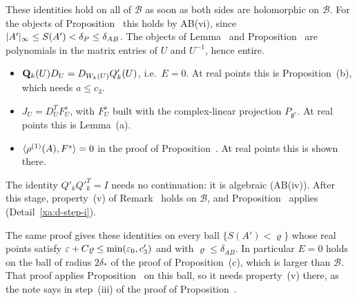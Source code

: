 \begin{detail}
\begin{step}
These identities hold on all of $\mathcal B$ as soon as both sides are holomorphic on $\mathcal B$. For the objects of Proposition~ this holds by AB(vi), since $\lvert A'\rvert_\infty\le S(A')<\delta_P\le\delta_{AB}$. The objects of Lemma~ and Proposition~ are polynomials in the matrix entries of $U$ and $U^{-1}$, hence entire.
\begin{itemize}
\item $\mathbf Q_k(U)D_U=D_{W_k(U)}Q'_k(U)$, i.e.\ $E=0$. At real points this is Proposition~(b), which needs $a\le c_3$.
\item $J_U=D_U^TF^s_U$, with $F^s_U$ built with the complex-linear projection $P_{\mathfrak g^c}$. At real points this is Lemma~(a).
\item $\langle \rho^{(1)}(A),F^s\rangle=0$ in the proof of Proposition~. At real points this is shown there.
\end{itemize}
The identity $Q'_kQ'^T_k=I$ needs no continuation: it is algebraic (AB(iv)). After this stage, property~(v) of Remark~ holds on $\mathcal B$, and Proposition~ applies (Detail~\ref{xa:d-step-i}).

The same proof gives these identities on every ball $\{S(A')<\varrho\}$ whose real points satisfy $\varepsilon+C\varrho\le\min(\varepsilon_0,c'_3)$ and with $\varrho\le\delta_{AB}$. In particular $E=0$ holds on the ball of radius $2\delta_*$ of the proof of Proposition~(c), which is larger than $\mathcal B$. That proof applies Proposition~ on this ball, so it needs property~(v) there, as the note says in step~(iii) of the proof of Proposition~.
\end{step}


\end{detail}
